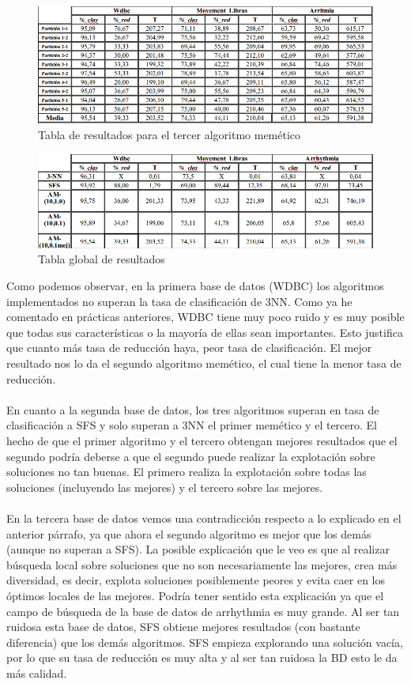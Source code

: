 \begin{figure} [H]
\centering
\includegraphics[width=1.0\linewidth]{AM3}
\caption{Tabla de resultados para el tercer algoritmo memético}
\label{fig:AM3}
\end{figure}


\begin{figure} [H]
\centering
\includegraphics[width=1.0\linewidth]{todos}
\caption{Tabla global de resultados}
\label{fig:todos}
\end{figure}

Como podemos observar, en la primera base de datos (WDBC) los algoritmos implementados no superan la tasa de clasificación de 3NN. Como ya he comentado en prácticas anteriores, WDBC tiene muy poco ruido y es muy posible que todas sus características o la mayoría de ellas sean importantes. Esto justifica que cuanto más tasa de reducción haya, peor tasa de clasificación. El mejor resultado nos lo da el segundo algoritmo memético, el cual tiene la menor tasa de reducción.
\\
\\
En cuanto a la segunda base de datos, los tres algoritmos superan en tasa de clasificación a SFS y solo superan a 3NN el primer memético y el tercero. El hecho de que el primer algoritmo y el tercero obtengan mejores resultados que el segundo podría deberse a que el segundo puede realizar la explotación sobre soluciones no tan buenas. El primero realiza la explotación sobre todas las soluciones (incluyendo las mejores) y el tercero sobre las mejores.
\\
\\
En la tercera base de datos vemos una contradicción respecto a lo explicado en el anterior párrafo, ya que ahora el segundo algoritmo es mejor que los demás (aunque no superan a SFS). La posible explicación que le veo es que al realizar búsqueda local sobre soluciones que no son necesariamente las mejores, crea más diversidad, es decir, explota soluciones posiblemente peores y evita caer en los óptimos locales de las mejores. Podría tener sentido esta explicación ya que el campo de búsqueda de la base de datos de arrhythmia es muy grande. Al ser tan ruidosa esta base de datos, SFS obtiene mejores resultados (con bastante diferencia) que los demás algoritmos. SFS empieza explorando una solución vacía, por lo que su tasa de reducción es muy alta y al ser tan ruidosa la BD esto le da más calidad.


